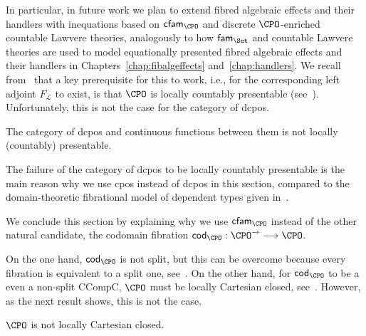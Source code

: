 In particular, in future work we plan to extend fibred algebraic effects and their handlers with inequations based on $\mathsf{cfam}_{\CPO}$ and discrete $\CPO$-enriched countable Lawvere theories, analogously to how $\mathsf{fam}_{\Set}$ and countable Lawvere theories are used to model equationally presented fibred algebraic effects and their handlers in Chapters~\ref{chap:fibalgeffects} and~\ref{chap:handlers}. We recall from~\cite{Hyland:DiscreteLawTh} that a key prerequisite for this to work, i.e., for the corresponding left adjoint $F_{\mathcal{L}}$ to exist, is that $\CPO$ is locally countably presentable (see~\cite[Example~1.18 (2)]{Adamek:LocallyPresentableCats}). 
Unfortunately, this is not the case for the category of dcpos. 

\begin{proposition}
\label{prop:dcposarenotpresentable}
The category of dcpos and continuous functions between them is not locally (countably) presentable. 
\end{proposition}

The failure of the category of dcpos to be locally countably presentable is the main reason why we use cpos instead of dcpos in this section, compared to the domain-theoretic fibrational model of dependent types given in~\cite[Section~10.6]{Jacobs:Book}.

We conclude this section by explaining why we use $\mathsf{cfam}_{\CPO}$ instead of the other natural candidate, the codomain fibration $\mathsf{cod}_{\CPO} : \CPO^{\to} \longrightarrow \CPO$. 

On the one hand, $\mathsf{cod}_{\CPO}$ is not split, but this can be overcome because every fibration is equivalent to a split one, see~\cite[Corollary~5.2.5]{Jacobs:Book}. On the other hand, for $\mathsf{cod}_{\CPO}$ to be a even a non-split CCompC, $\CPO$ must be locally Cartesian closed, see~\cite[Theorem~10.5.5 (ii)]{Jacobs:Book}. However, as the next result shows, this is not the case.

\begin{theorem}
$\CPO$ is not locally Cartesian closed.
\end{theorem}

